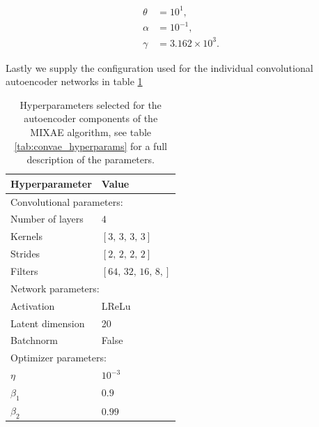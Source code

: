 \documentclass[review,number,sort&compress]{elsarticle}
\begin{document}
\begin{align}
\theta &= 10^{1}, \\
\alpha &= 10^{-1}, \\
\gamma &= 3.162\times 10^3.
\end{align}

Lastly we supply the configuration used for the individual convolutional autoencoder networks in table \ref{tab:mixe_ae_hyperparams}

\begin{table}[H]
\renewcommand*{\arraystretch}{0.5}
\centering
\caption{Hyperparameters selected for the autoencoder components of the MIXAE algorithm, see table \ref{tab:convae_hyperparams} for a full description of the parameters.}\label{tab:mixe_ae_hyperparams}
\setlength{\extrarowheight}{15pt}
\hspace*{-0.5in}
\begin{tabular}{ll}
\toprule
Hyperparameter & Value \\
\midrule
\multicolumn{2}{l}{Convolutional parameters: } \\
\midrule
Number of layers & $4$ \\
Kernels & $[3,\,3,\,3,\,3]$\\
Strides & $[2,\,2,\,2,\,2]$ \\
Filters & $[64,\, 32, \,16, \,8,]$ \\ 
\midrule
\multicolumn{2}{l}{Network parameters: } \\
\midrule
Activation & LReLu \\
Latent dimension & 20  \\
Batchnorm & False \\
\midrule
\multicolumn{2}{l}{Optimizer parameters: } \\
\midrule
$\eta$ & $10^{-3}$ \\
$\beta_1$ & $0.9$ \\
$\beta_2$ & $0.99$ \\
\bottomrule
\end{tabular}
\end{table}



\end{document}
